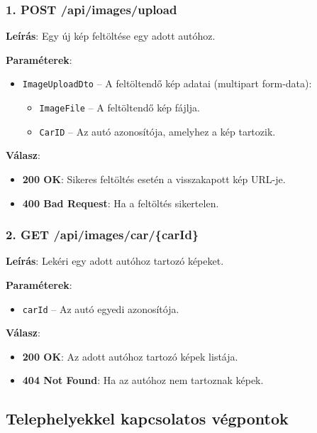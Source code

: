 \documentclass{report}[11pt]
\begin{document}
\subsubsection{1. POST /api/images/upload}

\textbf{Leírás}:  
Egy új kép feltöltése egy adott autóhoz.

\textbf{Paraméterek}:  
\begin{itemize}
    \item \texttt{ImageUploadDto} – A feltöltendő kép adatai (multipart form-data):
    \begin{itemize}
        \item \texttt{ImageFile} – A feltöltendő kép fájlja.
        \item \texttt{CarID} – Az autó azonosítója, amelyhez a kép tartozik.
    \end{itemize}
\end{itemize}

\textbf{Válasz}:  
\begin{itemize}
    \item \textbf{200 OK}: Sikeres feltöltés esetén a visszakapott kép URL-je.
    \item \textbf{400 Bad Request}: Ha a feltöltés sikertelen.
\end{itemize}

\subsubsection{2. GET /api/images/car/\{carId\}}

\textbf{Leírás}:  
Lekéri egy adott autóhoz tartozó képeket.

\textbf{Paraméterek}:  
\begin{itemize}
    \item \texttt{carId} – Az autó egyedi azonosítója.
\end{itemize}

\textbf{Válasz}:  
\begin{itemize}
    \item \textbf{200 OK}: Az adott autóhoz tartozó képek listája.
    \item \textbf{404 Not Found}: Ha az autóhoz nem tartoznak képek.
\end{itemize}

\subsection{Telephelyekkel kapcsolatos végpontok}
\end{document}
